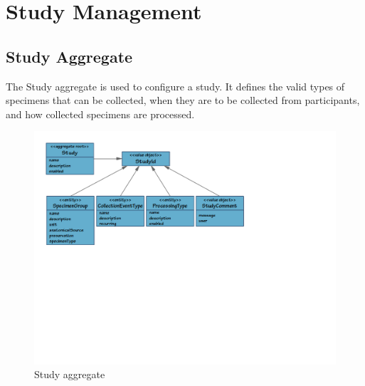 \chapter{Study Management}

\section{Study Aggregate}

 The Study aggregate is used to configure a study. It defines the valid types
 of specimens that can be collected, when they are to be collected from
 participants, and how collected specimens are processed.

\begin{figure}[h]
  \includegraphics[trim={9mm 104mm 80mm 9mm}, clip,
    width=1\textwidth]{images/study-aggregate}
  \caption{Study aggregate}
  \label{fig:study-aggregate}
\end{figure}

